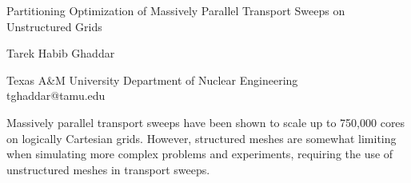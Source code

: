 \documentclass[a4paper]{article}
\begin{document}

\Large
 \begin{center}
Partitioning Optimization of Massively Parallel Transport Sweeps on Unstructured Grids\\ 

\hspace{10pt}

\large
Tarek Habib Ghaddar\\

\hspace{10pt}

\small  
Texas A\&M University Department of Nuclear Engineering\\
tghaddar@tamu.edu\\

\end{center}

\hspace{10pt}

\normalsize
Massively parallel transport sweeps have been shown to scale up to 750,000 cores on logically Cartesian grids. However, structured meshes are somewhat limiting when  simulating more complex problems and experiments, requiring the use of unstructured meshes in transport sweeps.
\end{document}
